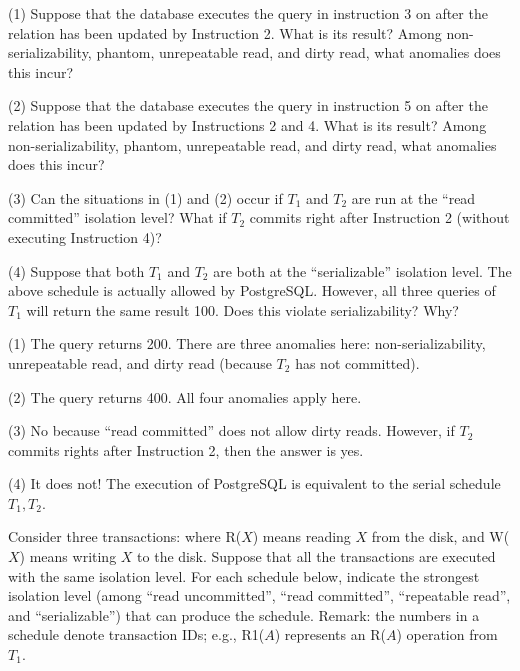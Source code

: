 

(1) Suppose that the database executes the query in instruction 3 on  after the relation has been updated by Instruction 2. What is its result? Among non-serializability, phantom, unrepeatable read, and dirty read, what anomalies does this incur?

\vgap

(2) Suppose that the database executes the query in instruction 5 on  after the relation has been updated by Instructions 2 and 4. What is its result? Among non-serializability, phantom, unrepeatable read, and dirty read, what anomalies does this incur?

\vgap

(3) Can the situations in (1) and (2) occur if $T_1$ and $T_2$ are run at the ``read committed'' isolation level? What if $T_2$ commits right after Instruction 2 (without executing Instruction 4)?

\vgap

(4) Suppose that both $T_1$ and $T_2$ are both at the ``serializable'' isolation level. The above schedule is actually allowed by PostgreSQL. However, all three queries of $T_1$ will return the same result 100. Does this violate serializability? Why?

\begin{sol}
     (1) The query returns 200. There are three anomalies here: non-serializability, unrepeatable read, and dirty read (because $T_2$ has not committed).

    \vgap

    (2) The query returns 400. All four anomalies apply here.

    \vgap

    (3) No because ``read committed'' does not allow dirty reads. However, if $T_2$ commits rights after Instruction 2, then the answer is yes.

    \vgap

    (4) It does not! The execution of PostgreSQL is equivalent to the serial schedule $T_1, T_2$.
\end{sol}

 Consider three transactions:
where R($X$) means reading $X$ from the disk, and W($X$) means writing $X$ to the disk. Suppose that all the transactions are executed with the same isolation level. For each schedule below, indicate the strongest isolation level (among ``read uncommitted'', ``read committed'', ``repeatable read'', and ``serializable'') that can produce the schedule. Remark: the numbers in a schedule denote transaction IDs; e.g., R1($A$) represents an R($A$) operation from $T_1$.

